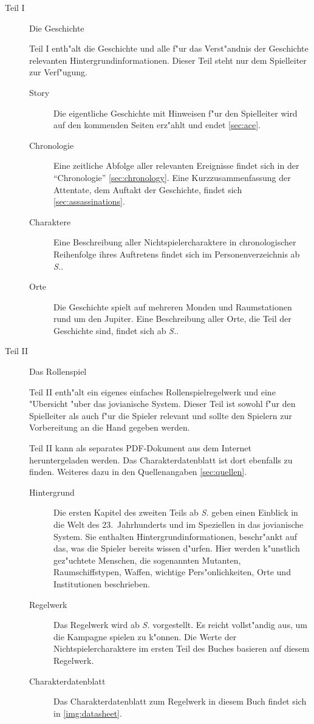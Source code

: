 \newcommand{\sfromref}[1]{ab \textit{S.\pageref{#1}}}
\begin{description}
    \item [Teil I] Die Geschichte

        Teil I enth"alt die Geschichte und alle f"ur das Verst"andnis der Geschichte relevanten Hintergrundinformationen. Dieser Teil steht nur dem Spielleiter zur Verf"ugung.
        \begin{description}
            \item [Story] Die eigentliche Geschichte mit Hinweisen f"ur den Spielleiter wird auf den kommenden Seiten erz"ahlt und endet \cref{sec:ace}.
            \item [Chronologie] Eine zeitliche Abfolge aller relevanten Ereignisse findet sich in der ``Chronologie'' 
                \cref{sec:chronology}. Eine Kurzzusammenfassung der Attentate, dem Auftakt der Geschichte, findet sich  \cref{sec:assassinations}.
            \item [Charaktere] Eine Beschreibung aller Nichtspielercharaktere in chronologischer Reihenfolge ihres Auftretens findet sich 
                im Personenverzeichnis  \sfromref{sec:nsc}.
            \item [Orte]  Die Geschichte spielt auf mehreren Monden und Raumstationen rund um den Jupiter. Eine Beschreibung aller Orte, 
                die Teil der Geschichte sind, findet sich \sfromref{sec:locations}.
        \end{description}
    \item [Teil II] Das Rollenspiel

        Teil II enth"alt ein eigenes einfaches Rollenspielregelwerk und eine "Ubersicht "uber das jovianische System. Dieser Teil ist sowohl f"ur den Spielleiter als auch f"ur die Spieler relevant und sollte den Spielern zur Vorbereitung an die Hand gegeben werden. 
    
        Teil II kann als separates PDF-Dokument aus dem Internet heruntergeladen werden. Das Charakterdatenblatt ist dort ebenfalls zu finden. Weiteres dazu in den Quellenangaben \cref{sec:quellen}.
        \begin{description}
            \item [Hintergrund] Die ersten Kapitel des zweiten Teils \sfromref{sec:rpg} geben einen Einblick in die Welt des 
                23.~Jahrhunderts und im Speziellen in das jovianische System. Sie enthalten Hintergrundinformationen, beschr"ankt auf das, was die Spieler bereits wissen d"urfen. Hier werden k"unstlich gez"uchtete Menschen, die sogenannten Mutanten, Raumschiffstypen, Waffen, wichtige Pers"onlichkeiten, Orte und Institutionen beschrieben.
            \item [Regelwerk] Das Regelwerk wird \sfromref{sec:rules} vorgestellt. Es reicht vollst"andig aus, um die Kampagne 
                spielen zu k"onnen. Die Werte der Nichtspielercharaktere im ersten Teil des Buches basieren auf diesem Regelwerk.
            \item [Charakterdatenblatt] Das Charakterdatenblatt zum Regelwerk in diesem Buch findet sich in \cref{img:datasheet}.
        \end{description}        
\end{description}


